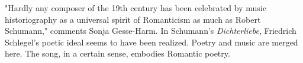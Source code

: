\documentclass[10pt,a4paper,twocolumn]{rho}
\begin{document}
"Hardly any composer of the 19th century has been celebrated by music historiography as a universal spirit of Romanticism as much as Robert Schumann," comments Sonja Gesse-Harm. In Schumann's \textit{Dichterliebe}, Friedrich Schlegel's poetic ideal seems to have been realized. Poetry and music are merged here. The song, in a certain sense, embodies Romantic poetry.

\printbibliography[title={REFERENCES}]

\end{document}
